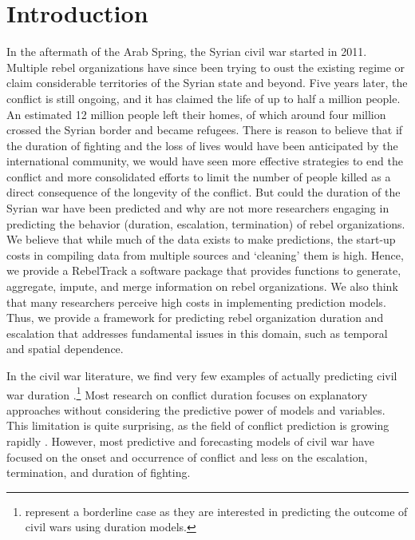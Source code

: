 \documentclass[11pt,oneside,fullpage]{amsart}
\begin{document}
\onehalfspacing

\section{Introduction}
In the aftermath of the Arab Spring, the Syrian civil war started in 2011. Multiple rebel organizations have since been trying to oust the existing regime or claim considerable territories of the Syrian state and beyond. Five years later, the conflict is still ongoing, and it has claimed the life of up to half a million people. An estimated 12 million people left their homes, of which around four million crossed the Syrian border and became refugees. There is reason to believe that if the duration of fighting and the loss of lives would have been anticipated by the international community, we would have seen more effective strategies to end the conflict and more consolidated efforts to limit the number of people killed as a direct consequence of the longevity of the conflict. But could the duration of the Syrian war have been predicted \citep[e.g.][]{Pilster01072014} and why are not more researchers engaging in predicting the behavior (duration, escalation, termination) of rebel organizations. We believe that while much of the data exists to make predictions, the start-up costs in compiling data from multiple sources and `cleaning' them is high. Hence, we provide a RebelTrack a software package that provides functions to generate, aggregate, impute, and merge information on rebel organizations. We also think that many researchers perceive high costs in implementing prediction models. Thus, we provide a framework for predicting rebel organization duration and escalation that addresses fundamental issues in this domain, such as temporal and spatial dependence. 

In the civil war literature, we find very few examples of actually predicting civil war duration \citep{Pilster01072014,chiba:2015}.\footnote{\citet{mason1999win} represent a borderline case as they are interested in predicting the outcome of civil wars using duration models.} Most research on conflict duration focuses on explanatory approaches without considering the predictive power of models and variables. This limitation is quite surprising, as the field of conflict prediction is growing rapidly \citep[e.g.][]{gurr1986forecasting,o2002anticipating,schrodt2006forecasting,goldstone:2010,weidmann:2010,Schneider01022011,de2011new,ward2013,Gleditsch01012013,hegre2013predicting,bell2013coercion,brandt2014evaluating,Muchlinski01012016}. However, most predictive and forecasting models of civil war have focused on the onset and occurrence of conflict and less on the escalation, termination, and duration of fighting. 
\end{document}
